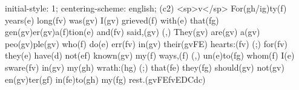 initial-style: 1;
centering-scheme: english;
(c2) <sp>v</sp> For(gh/ig)ty(f) years(e) long(fv) was(gv) I(gv) grieved(f) with(e) that(fg) gen(gv)er(gv)a(f)tion(e) and(fv) said,(gv) (,) They(gv) are(gv) a(gv) peo(gv)ple(gv) who(f) do(e) err(fv) in(gv) their(gvFE) hearts:(fv) (;) for(fv) they(e) have(d) not(ef) known(gv) my(f) ways,(f) (,) un(e)to(fg) whom(f) I(e) sware(fv) in(gv) my(gh) wrath:(hg) (;) that(fe) they(fg) should(gv) not(gv) en(gv)ter(gf) in(fe)to(gh) my(fg) rest.(gvFEfvEDCdc)
